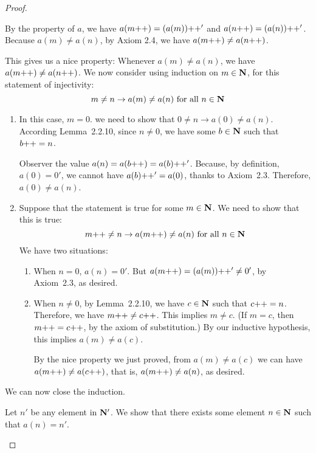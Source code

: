 \begin{proof}
\begin{enumerate}
	By the property of $a$, we have $a(m{+}{+}) = (a(m)){+}{+}'$ and $a(n{+}{+}) = (a(n)){+}{+}'$. Because $a(m) \ne a(n)$, by Axiom 2.4, we have $a(m{+}{+}) \ne a(n{+}{+})$. 
	
	This gives us a nice property: Whenever $a(m) \ne a(n)$, we have $a(m{+}{+}) \ne a(n{+}{+})$. We now consider using induction on $m \in \mathbf{N}$, for this statement of injectivity:
	\[
		m \ne n \to a(m) \ne a(n) \hbox{ for all } n \in \mathbf{N}
	\]
	
	\begin{enumerate}
		\item \mybcbox In this case, $m = 0$. we need to show that $0 \ne n \to a(0) \ne a(n)$. According Lemma~2.2.10, since $n \ne 0$, we have some $b \in \mathbf{N}$ such that $b{+}{+} = n$.
		
		Observer the value $a(n) = a(b{+}{+}) = a(b){+}{+}'$. Because, by definition, $a(0) = 0'$, we cannot have $a(b){+}{+}' = a(0)$, thanks to Axiom~2.3. Therefore, $a(0) \ne a(n)$.
		
		\item \myisbox Suppose that the statement is true for some $m \in \mathbf{N}$. We need to show that this is true:
		\[
			m{+}{+} \ne n \to a(m{+}{+}) \ne a(n) \hbox{ for all } n \in \mathbf{N}
		\]
		We have two situations:
		\begin{enumerate}
			\item When $n = 0$, $a(n) = 0'$. But $a(m{+}{+}) = (a(m)){+}{+}' \ne 0'$, by Axiom~2.3, as desired.
			
			\item When $n \ne 0$, by Lemma~2.2.10, we have $c \in \mathbf{N}$ such that $c{+}{+} = n$.
			Therefore, we have $m{+}{+} \ne c{+}{+}$. This implies $m \ne c$. (If $m = c$, then $m{+}{+} = c{+}{+}$, by the axiom of substitution.) By our inductive hypothesis, this implies $a(m) \ne a(c)$.
			
			By the nice property we just proved, from $a(m) \ne a(c)$ we can have $a(m{+}{+}) \ne a(c{+}{+})$, that is, $a(m{+}{+}) \ne a(n)$, as desired.
		\end{enumerate}
	\end{enumerate}

	We can now close the induction.

	 Let $n'$ be any element in $\mathbf{N}'$. We show that there exists some element $n \in \mathbf{N}$ such that $a(n) = n'$.
	

\end{enumerate}
\end{proof}

